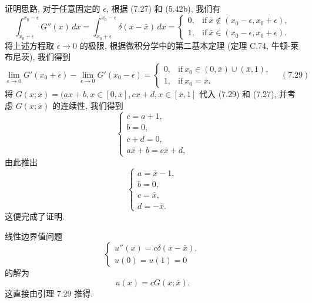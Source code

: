 \documentclass[a4paper]{ctexart}
\newcommand{\hl}[1]
{\noindent {\bf {#1}}}
\begin{document}
证明思路, 对于任意固定的 $\epsilon$, 根据 (7.27) 和 (5.42b), 我们有
$$
\int_{x_0 + \epsilon}^{x_0 - \epsilon} G''(x) \, dx 
= \int_{x_0 + \epsilon}^{x_0 - \epsilon} \delta(x - \bar{x}) \, dx = 
\begin{cases}
0, & \text{if} \ \bar{x} \notin (x_0 - \epsilon, x_0 + \epsilon), \\
1, & \text{if} \ \bar{x} \in (x_0 - \epsilon, x_0 + \epsilon).
\end{cases}
$$
将上述方程取 $\epsilon \to 0$ 的极限, 根据微积分学中的第二基本定理 
(定理 C.74, 牛顿-莱布尼茨), 我们得到
$$
\lim_{\epsilon \to 0} G'(x_0 + \epsilon) - \lim_{\epsilon \to 0} 
G'(x_0 - \epsilon) = \begin{cases}
0, & \text{if} \ x_0 \in (0, \bar{x}) \cup (\bar{x}, 1), \\
1, & \text{if} \ x_0 = \bar{x}.
\end{cases} \quad (7.29)
$$
将 $G(x; \bar{x}) = (ax + b, x \in [0, \bar{x}], cx + d, x \in [\bar{x}, 1]$ 
代入 (7.29) 和 (7.27), 并考虑 $G(x; \bar{x})$ 的连续性, 我们得到
$$
\begin{cases}
c = a + 1, \\
b = 0, \\
c + d = 0, \\
a\bar{x} + b = c\bar{x} + d,
\end{cases}
$$
由此推出
$$
\begin{cases}
a = \bar{x} - 1, \\
b = 0, \\
c = \bar{x}, \\
d = -\bar{x}.
\end{cases}
$$
这便完成了证明. 

\hl{推论 7.30} 线性边界值问题
$$
\begin{cases}
u''(x) = c\delta(x - \bar{x}), \\
u(0) = u(1) = 0
\end{cases}
$$
的解为
$$
u(x) = cG(x; \bar{x}).
$$
这直接由引理 7.29 推得.


\end{document}
